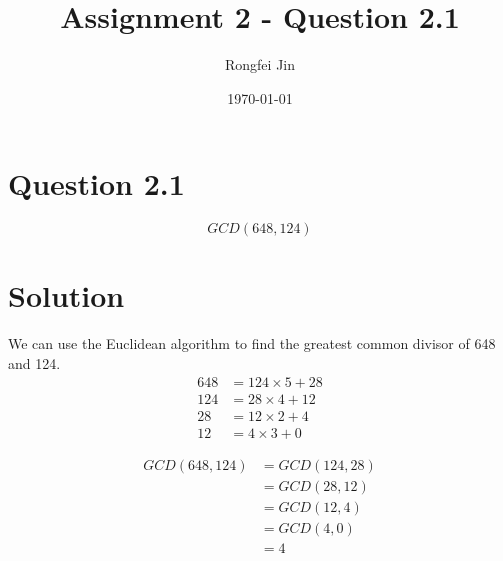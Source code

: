\documentclass{article}
\author{Rongfei Jin}
\title{Assignment 2 - Question 2.1}
\date{\today}
\begin{document}
\section{Question 2.1}
$$
GCD(648, 124)
$$

\section{Solution}
We can use the Euclidean algorithm to find the greatest common divisor of 648 and 124.
\begin{align*}
648 &= 124 \times 5 + 28 \\
124 &= 28 \times 4 + 12 \\
28 &= 12 \times 2 + 4 \\
12 &= 4 \times 3 + 0
\end{align*}

\begin{align*}
GCD(648, 124) &= GCD(124, 28) \\
&= GCD(28, 12) \\
&= GCD(12, 4) \\
&= GCD(4, 0) \\
&= 4
\end{align*}
\end{document}
